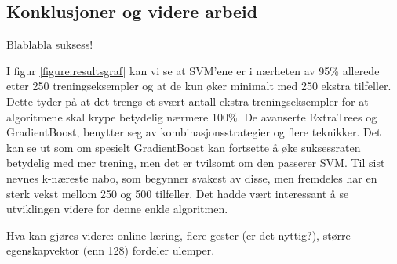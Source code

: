 \subsection{Konklusjoner og videre arbeid}
Blablabla suksess!

I figur \ref{figure:resultsgraf} kan vi se at SVM'ene er i nærheten av 95\% allerede etter 250 treningseksempler og at de kun øker minimalt med 250 ekstra tilfeller. Dette tyder på at det trengs et svært antall ekstra treningseksempler for at algoritmene skal krype betydelig nærmere 100\%. De avanserte ExtraTrees og GradientBoost, benytter seg av kombinasjonsstrategier og flere teknikker. Det kan se ut som om spesielt GradientBoost kan fortsette å øke suksessraten betydelig med mer trening, men det er tvilsomt om den passerer SVM. Til sist nevnes k-næreste nabo, som begynner svakest av disse, men fremdeles har en sterk vekst mellom 250 og 500 tilfeller. Det hadde vært interessant å se utviklingen videre for denne enkle algoritmen.

Hva kan gjøres videre: online læring, flere gester (er det nyttig?), større egenskapvektor (enn 128) fordeler ulemper.



